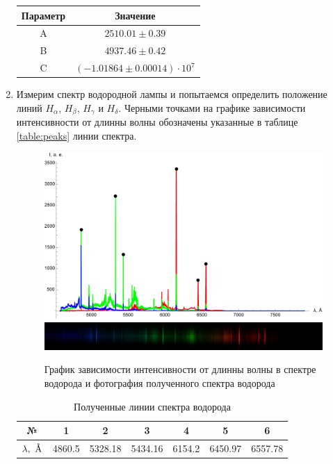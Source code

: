 \documentclass[a4paper, 12pt]{article}
\newcommand{\angstrom}{\textup{\AA}}
\begin{document}
\begin{enumerate}
\begin{table}[!h]
\begin{tabular}{|c|c|}
				Параметр & Значение\\
				\hline
				A & $2510.01 \pm 0.39$\\
				B & $4937.46 \pm 0.42$\\
				C & $(-1.01864 \pm 0.00014)\cdot10^7$\\
				\hline
			\end{tabular}
			\label{table:calapprox}
		\end{table}
		\item Измерим спектр водородной лампы и попытаемся определить положение линий $H_{\alpha}$, $H_{\beta}$, $H_{\gamma}$ и $H_{\delta}$. Черными точками на графике зависимости интенсивности от длинны волны обозначены указанные в таблице \ref{table:peaks} линии спектра.
		\begin{figure}
		    \includegraphics[width=\linewidth]{h2_plot_peaks.pdf}
		    \endminipage\\
		    \includegraphics[width=\linewidth]{h2_spectre.JPG}
		    \endminipage
		    \caption{График зависимости интенсивности от длинны волны в спектре водорода и фотография полученного спектра водорода}
		\end{figure}
		\begin{table}
		    \centering
		    \caption{Полученные линии спектра водорода}
		    \begin{tabular}{|c|c|c|c|c|c|c|}
		        \hline
		        № & 1 & 2 & 3 & 4 & 5 & 6\\
		        \hline
		        $\lambda,\ \angstrom$ & 4860.5 & 5328.18 & 5434.16 & 6154.2 & 6450.97 & 6557.78 \\

\end{tabular}
\end{table}
\end{enumerate}
\end{document}
